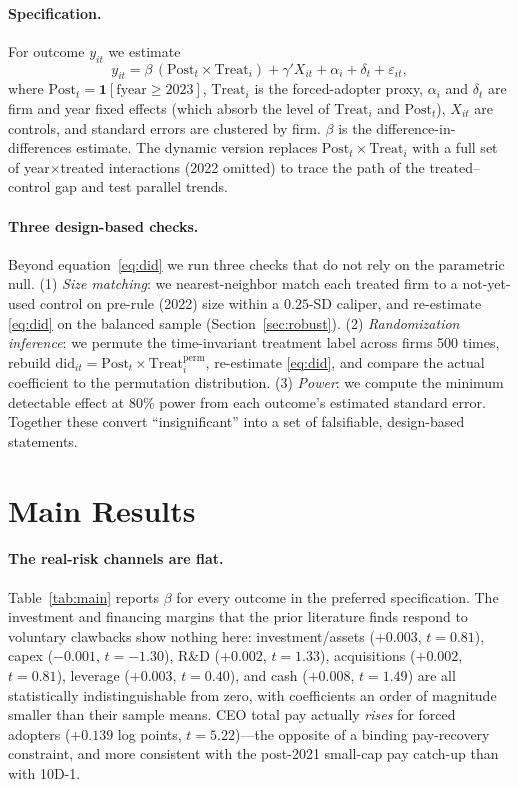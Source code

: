 \documentclass[12pt]{article}
\begin{document}
\paragraph{Specification.} For outcome $y_{it}$ we estimate
\begin{equation}
y_{it} = \beta\,(\text{Post}_t \times \text{Treat}_i) + \gamma' X_{it} + \alpha_i + \delta_t + \varepsilon_{it},
\label{eq:did}
\end{equation}
where $\text{Post}_t=\mathbf{1}[\text{fyear}\geq 2023]$, $\text{Treat}_i$ is the forced-adopter
proxy, $\alpha_i$ and $\delta_t$ are firm and year fixed effects (which absorb the level of
$\text{Treat}_i$ and $\text{Post}_t$), $X_{it}$ are controls, and standard errors are clustered
by firm. $\beta$ is the difference-in-differences estimate. The dynamic version replaces
$\text{Post}_t\times\text{Treat}_i$ with a full set of year$\times$treated interactions
(2022 omitted) to trace the path of the treated--control gap and test parallel trends.

\paragraph{Three design-based checks.} Beyond equation~\eqref{eq:did} we run three checks that
do not rely on the parametric null. (1) \emph{Size matching}: we nearest-neighbor match each
treated firm to a not-yet-used control on pre-rule (2022) size within a $0.25$-SD caliper, and
re-estimate \eqref{eq:did} on the balanced sample (Section~\ref{sec:robust}). (2)
\emph{Randomization inference}: we permute the time-invariant treatment label across firms 500
times, rebuild $\text{did}_{it}=\text{Post}_t\times\text{Treat}^{\text{perm}}_i$, re-estimate
\eqref{eq:did}, and compare the actual coefficient to the permutation distribution. (3)
\emph{Power}: we compute the minimum detectable effect at 80\% power from each outcome's
estimated standard error. Together these convert ``insignificant'' into a set of falsifiable,
design-based statements.

\section{Main Results}\label{sec:res}
\paragraph{The real-risk channels are flat.} Table~\ref{tab:main} reports $\beta$ for every
outcome in the preferred specification. The investment and financing margins that the prior
literature finds respond to voluntary clawbacks show nothing here: investment/assets
($+0.003$, $t=0.81$), capex ($-0.001$, $t=-1.30$), R\&D ($+0.002$, $t=1.33$), acquisitions
($+0.002$, $t=0.81$), leverage ($+0.003$, $t=0.40$), and cash ($+0.008$, $t=1.49$) are all
statistically indistinguishable from zero, with coefficients an order of magnitude smaller than
their sample means. CEO total pay actually \emph{rises} for forced adopters ($+0.139$ log
points, $t=5.22$)---the opposite of a binding pay-recovery constraint, and more consistent with
the post-2021 small-cap pay catch-up than with 10D-1.
\end{document}
